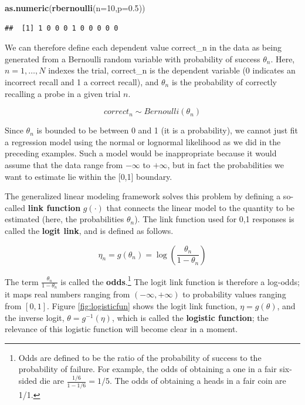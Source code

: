 \documentclass[12pt,]{krantz}
\newenvironment{Shaded}{\begin{snugshade}}{\end{snugshade}}
\newcommand{\DataTypeTok}[1]{\textcolor[rgb]{0.13,0.29,0.53}{#1}}
\newcommand{\DecValTok}[1]{\textcolor[rgb]{0.00,0.00,0.81}{#1}}
\newcommand{\FloatTok}[1]{\textcolor[rgb]{0.00,0.00,0.81}{#1}}
\newcommand{\KeywordTok}[1]{\textcolor[rgb]{0.13,0.29,0.53}{\textbf{#1}}}
\newcommand{\NormalTok}[1]{#1}
\theoremstyle{definition}
\theoremstyle{definition}
\theoremstyle{definition}
\theoremstyle{remark}
\begin{document}
\begin{Shaded}
\begin{Highlighting}[]
\KeywordTok{as.numeric}\NormalTok{(}\KeywordTok{rbernoulli}\NormalTok{(}\DataTypeTok{n=}\DecValTok{10}\NormalTok{,}\DataTypeTok{p=}\FloatTok{0.5}\NormalTok{))}
\end{Highlighting}
\end{Shaded}

\begin{verbatim}
##  [1] 1 0 0 0 1 0 0 0 0 0
\end{verbatim}

We can therefore define each dependent value correct\_n in the data as being generated from a Bernoulli random variable with probability of success \(\theta_n\).
Here, \(n =1, \ldots, N\) indexes the trial, correct\_n is the dependent variable (0 indicates an incorrect recall and 1 a correct recall), and \(\theta_n\) is the probability of correctly recalling a probe in a given trial \(n\).

\begin{equation}
correct_n \sim Bernoulli(\theta_n)
\label{eq:bernoullilik}
\end{equation}

Since \(\theta_n\) is bounded to be between 0 and 1 (it is a probability), we cannot just fit a regression model using the normal or lognormal likelihood as we did in the preceding examples. Such a model would be inappropriate because it would assume that the data range from \(-\infty\) to \(+\infty\), but in fact the probabilities we want to estimate lie within the {[}0,1{]} boundary.

The generalized linear modeling framework solves this problem by defining a so-called \textbf{link function} \(g(\cdot)\) that connects the linear model to the quantity to be estimated (here, the probabilities \(\theta_n\)). The link function used for 0,1 responses is called the \textbf{logit link}, and is defined as follows.

\begin{equation}
\eta_n = g(\theta_n) = \log\left(\frac{\theta_n}{1-\theta_n}\right)
\end{equation}

The term \(\frac{\theta_n}{1-\theta_n}\) is called the \textbf{odds}.\footnote{Odds are defined to be the ratio of the probability of success to the probability of failure. For example, the odds of obtaining a one in a fair six-sided die are \(\frac{1/6}{1-1/6}=1/5\). The odds of obtaining a heads in a fair coin are 1/1.} The logit link function is therefore a log-odds; it maps real numbers ranging from \((-\infty,+\infty)\) to probability values ranging from \([0,1]\). Figure \ref{fig:logisticfun} shows the logit link function, \(\eta = g(\theta)\), and the inverse logit, \(\theta = g^{-1}(\eta)\), which is called the \textbf{logistic function}; the relevance of this logistic function will become clear in a moment.
\end{document}
